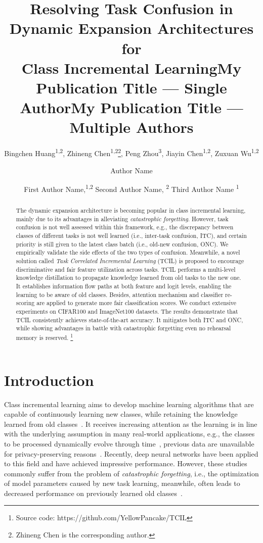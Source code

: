 \documentclass[letterpaper]{article} %
\title{Resolving Task Confusion in Dynamic Expansion Architectures for \\ Class Incremental Learning}
\author{
    Bingchen Huang\textsuperscript{\rm 1,\rm 2},
    Zhineng Chen\textsuperscript{\rm 1,\rm 2}\thanks{Zhineng Chen is the corresponding author.},
    Peng Zhou\textsuperscript{\rm 3},
    Jiayin Chen\textsuperscript{\rm 1,\rm 2},
    Zuxuan Wu\textsuperscript{\rm 1,\rm 2}
}
\title{My Publication Title --- Single Author}
\author {
    Author Name
}
\title{My Publication Title --- Multiple Authors}
\author {
    First Author Name,\textsuperscript{\rm 1,\rm 2}
    Second Author Name, \textsuperscript{\rm 2}
    Third Author Name \textsuperscript{\rm 1}
}
\begin{document}
\maketitle

\begin{abstract}
The dynamic expansion architecture is becoming popular in class incremental learning, mainly due to its advantages in alleviating \emph{catastrophic forgetting}. However, task confusion is not well assessed within this framework, e.g., the discrepancy between classes of different tasks is not well learned (i.e., inter-task confusion, ITC), and certain priority is still given to the latest class batch (i.e., old-new confusion, ONC). We empirically validate the side effects of the two types of confusion. Meanwhile, a novel solution called \emph{Task Correlated Incremental Learning} (TCIL) is proposed to encourage discriminative and fair feature utilization across tasks. TCIL performs a multi-level knowledge distillation to propagate knowledge learned from old tasks to the new one. It establishes information flow paths at both feature and logit levels, enabling the learning to be aware of old classes. Besides, attention mechanism and classifier re-scoring are applied to generate more fair classification scores. We conduct extensive experiments on CIFAR100 and ImageNet100 datasets. The results demonstrate that TCIL consistently achieves state-of-the-art accuracy. It mitigates both ITC and ONC, while showing advantages in battle with catastrophic forgetting even no rehearsal memory is reserved. \footnote{Source code: https://github.com/YellowPancake/TCIL}
\end{abstract}



\section{Introduction}
Class incremental learning aims to develop machine learning algorithms that are capable of continuously learning new classes, while retaining the knowledge learned from old classes~\cite{m32,t54}. It receives increasing attention as the learning is in line with the underlying assumption in many real-world applications, e.g., the classes to be processed dynamically evolve through time~\cite{d25}, previous data are unavailable for privacy-preserving reasons~\cite{d19, e0}. Recently, deep neural networks have been applied to this field and have achieved impressive performance. However, these studies commonly suffer from the problem of \emph{catastrophic forgetting}, i.e., the optimization of model parameters caused by new task learning, meanwhile, often leads to decreased performance on previously learned old classes~\cite{m12,t38,lu2022bridging}.
\end{document}
